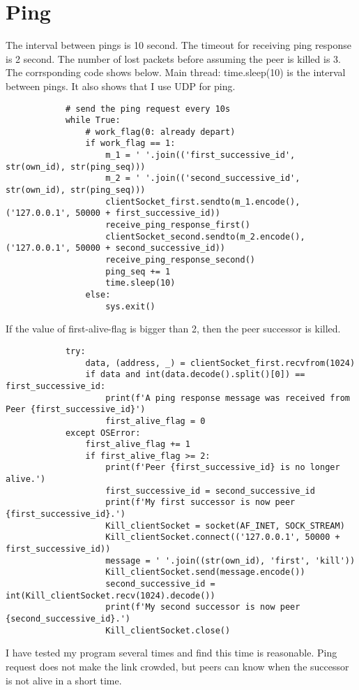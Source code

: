 \documentclass{article}
\begin{document}
	\section{Ping}
		The interval between pings is 10 second. The timeout for receiving ping response is 2 second. The number of lost packets before assuming the peer is killed is 3. The corrsponding code shows below.
		Main thread: time.sleep(10) is the interval between pings. It also shows that I use UDP for ping.
		\begin{lstlisting}
			# send the ping request every 10s
			while True:
				# work_flag(0: already depart)
				if work_flag == 1:
					m_1 = ' '.join(('first_successive_id', str(own_id), str(ping_seq)))
					m_2 = ' '.join(('second_successive_id', str(own_id), str(ping_seq)))
					clientSocket_first.sendto(m_1.encode(), ('127.0.0.1', 50000 + first_successive_id))
					receive_ping_response_first()
					clientSocket_second.sendto(m_2.encode(), ('127.0.0.1', 50000 + second_successive_id))
					receive_ping_response_second()
					ping_seq += 1
					time.sleep(10)
				else:
					sys.exit()
		\end{lstlisting}
		If the value of first-alive-flag is bigger than 2, then the peer successor is killed. 
		\begin{lstlisting}
		    try:
				data, (address, _) = clientSocket_first.recvfrom(1024)
				if data and int(data.decode().split()[0]) == first_successive_id:
					print(f'A ping response message was received from Peer {first_successive_id}')
					first_alive_flag = 0
			except OSError:
				first_alive_flag += 1
				if first_alive_flag >= 2:
					print(f'Peer {first_successive_id} is no longer alive.')
					first_successive_id = second_successive_id
					print(f'My first successor is now peer {first_successive_id}.')
					Kill_clientSocket = socket(AF_INET, SOCK_STREAM)
					Kill_clientSocket.connect(('127.0.0.1', 50000 + first_successive_id))
					message = ' '.join((str(own_id), 'first', 'kill'))
					Kill_clientSocket.send(message.encode())
					second_successive_id = int(Kill_clientSocket.recv(1024).decode())
					print(f'My second successor is now peer {second_successive_id}.')
					Kill_clientSocket.close()
		\end{lstlisting}
			I have tested my program several times and find this time is reasonable. Ping request does not make the link crowded, but peers can know when the successor is not alive in a short time.
\end{document}
